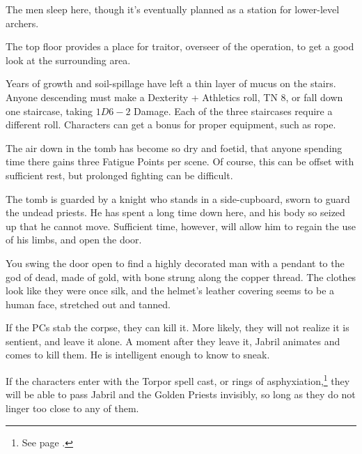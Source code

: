 \begin{multicols}{2}

The men sleep here, though it's eventually planned as a station for lower-level archers.


The top floor provides a place for \gls{traitor}, overseer of the operation, to get a good look at the surrounding area.

\traitor


Years of growth and soil-spillage have left a thin layer of mucus on the stairs.
Anyone descending must make a Dexterity + Athletics roll, TN 8, or fall down one staircase, taking $1D6-2$ Damage.
Each of the three staircases require a different roll.
Characters can get a bonus for proper equipment, such as rope.

The air down in the tomb has become so dry and foetid, that anyone spending time there gains three Fatigue Points per scene.
Of course, this can be offset with sufficient rest, but prolonged fighting can be difficult.


The tomb is guarded by a knight who stands in a side-cupboard, sworn to guard the undead priests.
He has spent a long time down here, and his body so seized up that he cannot move.
Sufficient time, however, will allow him to regain the use of his limbs, and open the door.

\begin{boxtext}

	You swing the door open to find a highly decorated man with a pendant to the god of dead, made of gold, with bone strung along the copper thread.  The clothes look like they were once silk, and the helmet's leather covering seems to be a human face, stretched out and tanned.

\end{boxtext}

If the PCs stab the corpse, they can kill it.
More likely, they will not realize it is sentient, and leave it alone.
A moment after they leave it, Jabril animates and comes to kill them.
He is intelligent enough to know to sneak.



If the characters enter with the Torpor spell cast, or rings of asphyxiation,\footnote{See page \pageref{ring_asphyxiation}.} they will be able to pass Jabril and the Golden Priests invisibly, so long as they do not linger too close to any of them.


\end{multicols}
